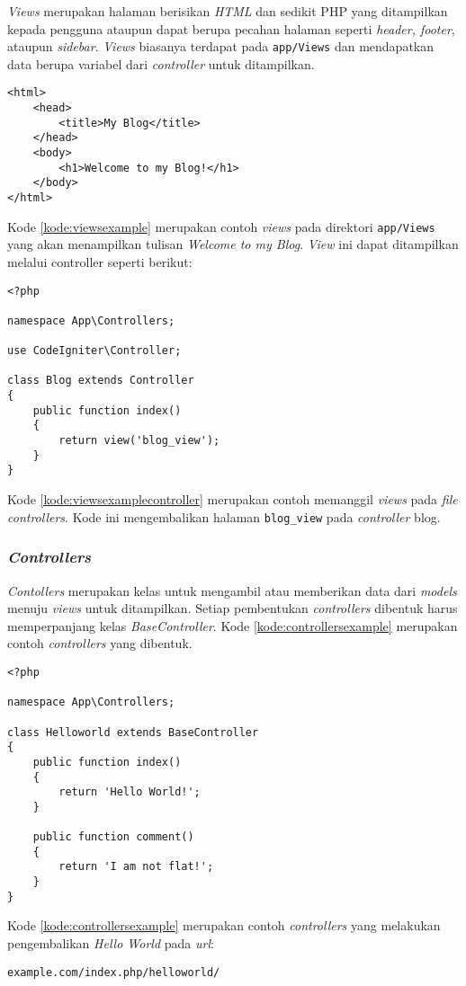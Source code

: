 \textit{Views} merupakan halaman berisikan \textit{HTML} dan sedikit PHP yang ditampilkan kepada pengguna ataupun dapat berupa pecahan halaman seperti \textit{header, footer}, ataupun \textit{sidebar}. \textit{Views} biasanya terdapat pada \verb|app/Views| dan mendapatkan data berupa variabel dari \textit{controller} untuk ditampilkan.

\begin{lstlisting}[caption=Contoh \textit{Views},label=kode:viewsexample]
<html>
    <head>
        <title>My Blog</title>
    </head>
    <body>
        <h1>Welcome to my Blog!</h1>
    </body>
</html>
\end{lstlisting}

Kode \ref{kode:viewsexample} merupakan contoh \textit{views} pada direktori \verb|app/Views| yang akan menampilkan tulisan \textit{Welcome to my Blog}. \textit{View} ini dapat ditampilkan melalui controller seperti berikut:
\begin{lstlisting}[caption=Contoh menampilkan \textit{Views} pada \textit{controller},label=kode:viewsexamplecontroller]
<?php

namespace App\Controllers;

use CodeIgniter\Controller;

class Blog extends Controller
{
    public function index()
    {
        return view('blog_view');
    }
}
\end{lstlisting}

Kode \ref{kode:viewsexamplecontroller} merupakan contoh memanggil \textit{views} pada \textit{file controllers}. Kode ini mengembalikan halaman \texttt{blog\_view} pada \textit{controller} blog.

\subsubsection{\textit{Controllers}}

\textit{Contollers} merupakan kelas untuk mengambil atau memberikan data dari \textit{models} menuju \textit{views} untuk ditampilkan. Setiap pembentukan \textit{controllers} dibentuk harus memperpanjang kelas \textit{BaseController}. Kode \ref{kode:controllersexample} merupakan contoh \textit{controllers} yang dibentuk.

\begin{lstlisting}[caption=Contoh \textit{Controllers} pada \textit{CodeIgniter 4},label=kode:controllersexample]
<?php

namespace App\Controllers;

class Helloworld extends BaseController
{
    public function index()
    {
        return 'Hello World!';
    }

    public function comment()
    {
        return 'I am not flat!';
    }
}
\end{lstlisting}
Kode \ref{kode:controllersexample} merupakan contoh \textit{controllers} yang melakukan pengembalikan \textit{Hello World} pada \textit{url}:
\begin{center}
\verb|example.com/index.php/helloworld/|
\end{center}

